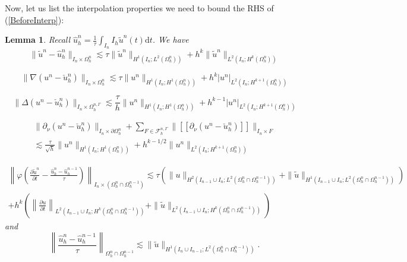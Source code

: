 \documentclass[11pt,a4paper]{article}
\theoremstyle{plain}
\newtheorem{lemma}[theorem]{Lemma}%
\theoremstyle{definition}
\theoremstyle{remark}
\numberwithin{equation}{section}
\newcommand{\dt}{\mathrm{d}t}
\begin{document}
Now, let us list the interpolation properties we need to bound the RHS of (\ref{BeforeInterp}):
\begin{lemma}	\label{LemInterp}
Recall $\hat{u}^n_h = \frac{1}{\tau}  \int_{I_n} I_h
	\tilde{u}^n (t) \dt$. We have
	\begin{equation}
		\label{L2intutil} \| \tilde{u}^n - \hat{u}^n_h \|_{I_n \times
			\Omega_h^n} \lesssim \tau \| \tilde{u}^n \|_{H^1 (I_n ; L^2 (\Omega^n_h))}
		+ h^k \| \tilde{u}^n \|_{L^2 (I_n ; H^k (\Omega^n_h))}
	\end{equation}


	\begin{equation}
		\label{H1intu} \| \nabla (u^n - \check{u}^n_h)\|_{I_n \times \Omega_h^n}
		\lesssim \tau \|u^n \|_{H^1 (I_n ; H^1 (\Omega^n_h))} + h^k |u^n |_{L^2
			(I_n ; H^{k + 1} (\Omega^n_h))}
	\end{equation}

	\begin{equation}
		\label{H2intu} \| \Delta (u^n - \check{u}^n_h) \|_{I_n \times{\Omega_h^{n,\Gamma}}}
		\lesssim \frac{\tau}{h} \|u^n \|_{H^1 (I_n; H^1(\Omega^n_h))}
			+ h^{k - 1} |u^n |_{L^2 (I_n ; H^{k + 1} (\Omega^n_h))}
	\end{equation}

	\begin{multline}\label{Edgesintu}
		 \|\partial_{\nu} ({u^n} - \check{u}^n_h)\|_{I_n \times
			\partial \Omega_h^n}
			+ \sum_{F\in\mathcal{F}_h^{n, \Gamma}}  \|[\![\partial_{\nu} ({u^n} - \check{u}^n_h) ]\!]\|_{I_n\times F} \\
			 \lesssim \frac{\tau}{\sqrt h} \| {u^n} \|_{H^1 (I_n; H^1 (\Omega^n_h))}
			 + h^{k - 1 / 2} \| {u^n} \|_{L^2 (I_n ; H^{k + 1}(\Omega^n_h))}
	\end{multline}

	\begin{multline}\label{L2intdudt}
	 \left\| \varphi \left( \frac{\partial \tilde{u}^n}{\partial t} -
	\frac{{\hat{u}_h^n}  - \hat{u}_h^{n - 1}}{\tau} \right) \right\|_{I_n	\times (\Omega_h^n \cap \Omega_h^{n - 1})}  \lesssim \tau (\|u\|_{H^2 (I_{n -
			1} \cup I_n ; L^2 (\Omega^n_h \cap \Omega_h^{n - 1}))} +\| \tilde{u} \|_{H^1
		(I_{n - 1} \cup I_n ; L^2 (\Omega^n_h \cap \Omega_h^{n - 1}))})
	\\
		 + h^k \left( \left\| \frac{\partial u}{\partial t}
		\right\|_{L^2 (I_{n - 1} \cup I_n ; H^k (\Omega^n_h \cap \Omega_h^{n -
				1}))} + \| \tilde{u} \|_{L^2 (I_{n - 1} \cup I_n ; H^k (\Omega^n_h \cap
			\Omega_h^{n - 1}))} \right)
	\end{multline}
and
\begin{equation}
	\label{Boundedintdudt} \left\| \frac{{\hat{u}_h^n}  - \hat{u}_h^{n -
			1}}{\tau} \right\|_{\Omega_h^n \cap \Omega_h^{n - 1}} \lesssim \|
	\tilde{u} \|_{H^1 (I_n \cup I_{n - 1} ; L^2 (\Omega^n_h \cap \Omega_h^{n -
			1}))}.
\end{equation}
\end{lemma}
\end{document}
